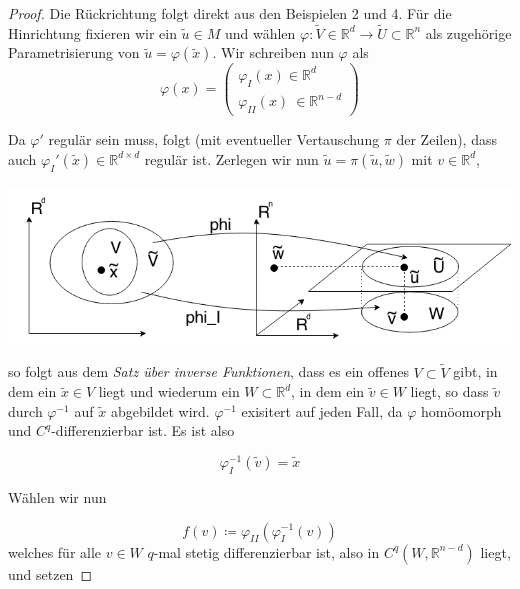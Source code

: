 \begin{proof}

Die Rückrichtung folgt direkt aus den Beispielen 2 und 4. Für die Hinrichtung fixieren wir ein $\tilde{u} \in M $ und wählen $\varphi : \tilde{V} \in \mathbb{R}^d
\rightarrow \tilde{U} \subset \mathbb{R}^n $ als zugehörige Parametrisierung von $\tilde{u} = \varphi (\tilde{x})$. Wir schreiben nun $\varphi$ als 
\begin{equation*}
\varphi(x)=\begin{pmatrix}\varphi_I(x) \in\mathbb{R}^d \\ \varphi_{II}(x) \ \in\mathbb{R}^{n-d} \end{pmatrix}
\end{equation*}

Da $\varphi'$ regulär sein muss, folgt (mit eventueller Vertauschung $\pi$ der Zeilen), dass auch $\varphi_I'(\tilde{x})\in\mathbb{R}^{d\times d}$ regulär ist. Zerlegen wir nun $\tilde{u}=\pi(\tilde{u},\tilde{w})$ mit $v\in\mathbb{R}^d$,

\begin{center}
\includegraphics[scale=0.5]{pictures/MA2_0010}\\
\end{center}

so folgt aus dem \emph{Satz über inverse Funktionen}, dass es ein offenes $V\subset\tilde{V}$ gibt, in dem ein $\tilde{x}\in V$ liegt und wiederum ein $W\subset\mathbb{R}^d$, in dem ein $\tilde{v}\in W$ liegt, so dass $\tilde{v}$ durch $\varphi^{-1}$ auf $\tilde{x}$ abgebildet wird. $\varphi^{-1}$ exisitert auf jeden Fall, da $\varphi$ homöomorph und $C^q$-differenzierbar ist. Es ist also

\begin{equation*}
\varphi_I^{-1}(\tilde{v})=\tilde{x}
\end{equation*}

Wählen wir nun 

\begin{equation*}
f(v) \coloneqq \varphi_{II} \left(\varphi_I ^{-1} (v)\right)
\end{equation*}
\linebreak
welches für alle $v \in W $ $q$-mal stetig differenzierbar ist, also in $C^q \left(W, \mathbb{R}^{n-d}\right) $ liegt, und setzen 


\end{proof}
